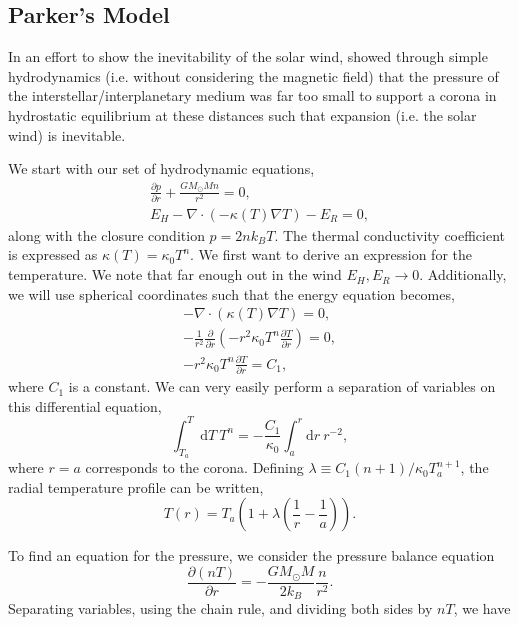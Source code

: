 	\subsection{Parker's Model}
	In an effort to show the inevitability of the solar wind, \citet{parker_dynamics_1958} showed through simple hydrodynamics (i.e. without considering the magnetic field) that the pressure of the interstellar/interplanetary medium was far too small to support a corona in hydrostatic equilibrium at these distances such that expansion (i.e. the solar wind) is inevitable. 
	
	We start with our set of hydrodynamic equations,
	\begin{align}
		\frac{\partial p}{\partial r} + \frac{GM_{\odot}Mn}{r^2} = 0, \\
		E_H - \nabla\cdot(-\kappa(T)\nabla T) - E_R = 0,
	\end{align}
	along with the closure condition $p=2nk_BT$. The thermal conductivity coefficient is expressed as $\kappa(T) = \kappa_0T^n$. We first want to derive an expression for the temperature. We note that far enough out in the wind $E_H,E_R\to 0$. Additionally, we will use spherical coordinates such that the energy equation becomes,
	\begin{align}
		-\nabla\cdot(\kappa(T)\nabla T) = 0, \\
		-\frac{1}{r^2}\frac{\partial}{\partial r}\left(-r^2\kappa_0T^n\frac{\partial T}{\partial r}\right) = 0, \\
		-r^2\kappa_0T^n\frac{\partial T}{\partial r} = C_1,
	\end{align}
	where $C_1$ is a constant. We can very easily perform a separation of variables on this differential equation,
	\begin{equation}
		\int^T_{T_a}\mathrm{d}T~T^n = -\frac{C_1}{\kappa_0}\int^r_a\mathrm{d}r~r^{-2},
	\end{equation}
	where $r=a$ corresponds to the corona. Defining $\lambda\equiv C_1(n+1)/\kappa_0T_a^{n+1}$, the radial temperature profile can be written,
	\begin{equation}
		T(r)=T_a\left(1+\lambda\left(\frac{1}{r} - \frac{1}{a}\right)\right).
	\end{equation}
	\par To find an equation for the pressure, we consider the pressure balance equation
	\begin{equation}
		\frac{\partial (nT)}{\partial r} = -\frac{GM_{\odot}M}{2k_B}\frac{n}{r^2}.
	\end{equation}
	Separating variables, using the chain rule, and dividing both sides by $nT$, we have
